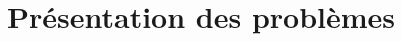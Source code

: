 \documentclass[a4paper,9pt]{report}
\begin{document}
%


\chapter{Pr\'{e}sentation des problèmes}


%
%
%
\end{document}
